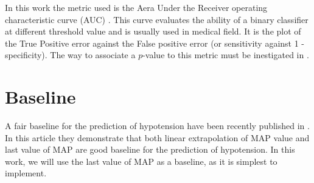 \documentclass[a4paper,12pt]{article}
\begin{document}
In this work the metric used is the Aera Under the Receiver operating characteristic curve (AUC) \cite{masonAreasRelativeOperating2002a}. This curve evaluates the ability of a binary classifier at different threshold value and is usually used in medical field. It is the plot of the True Positive error against the False positive error (or sensitivity against 1 - specificity). The way to associate a $p$-value to this metric must be inestigated in \cite{masonAreasRelativeOperating2002a}.

\section{Baseline}

A fair baseline for the prediction of hypotension have been recently published in \cite{jacquet-lagrezePredictionIntraoperativeHypotension2022}. In this article they demonstrate that both linear extrapolation of MAP value and last value of MAP are good baseline for the prediction of hypotension. In this work, we will use the last value of MAP as a baseline, as it is simplest to implement. \medskip




\end{document}

